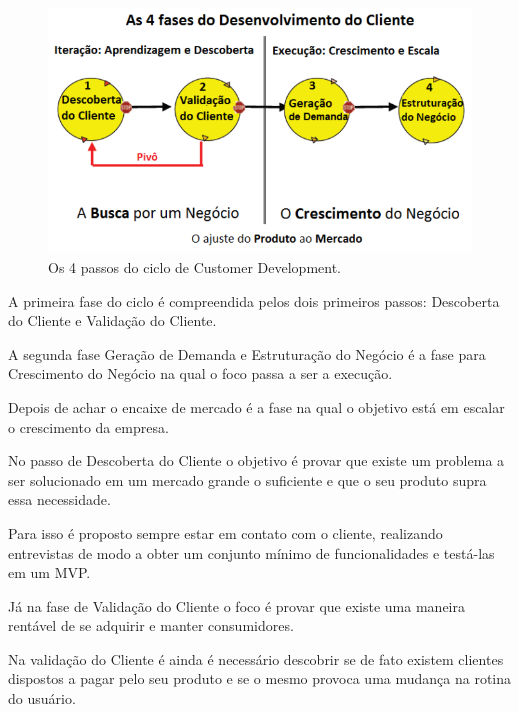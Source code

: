 \begin{figure}[htb]
\centering
\includegraphics[width=15cm]{figuras/customerdevelopment}
\caption{\label{fig:customerdevelopment}Os 4 passos do ciclo de Customer Development.}
\end{figure}
\par A primeira fase do ciclo é compreendida pelos dois primeiros passos: Descoberta do Cliente e Validação do Cliente.
\par A segunda fase Geração de Demanda e Estruturação do Negócio é a fase para Crescimento do Negócio na qual o foco passa a ser a execução.
\par Depois de achar o encaixe de mercado é a fase na qual o objetivo está em escalar o crescimento da empresa.
\par No passo de Descoberta do Cliente o objetivo é provar que existe um problema a ser solucionado em um mercado grande o suficiente e que o seu produto supra essa necessidade.
\par Para isso é proposto sempre estar em contato com o cliente, realizando entrevistas de modo a obter um conjunto mínimo de funcionalidades e testá-las em um MVP.
\par Já na fase de Validação do Cliente o foco é provar que existe uma maneira rentável de se adquirir e manter consumidores.
\par Na validação do Cliente é ainda é necessário descobrir se de fato existem clientes dispostos a pagar pelo seu produto e se o mesmo provoca uma mudança na rotina do usuário.
